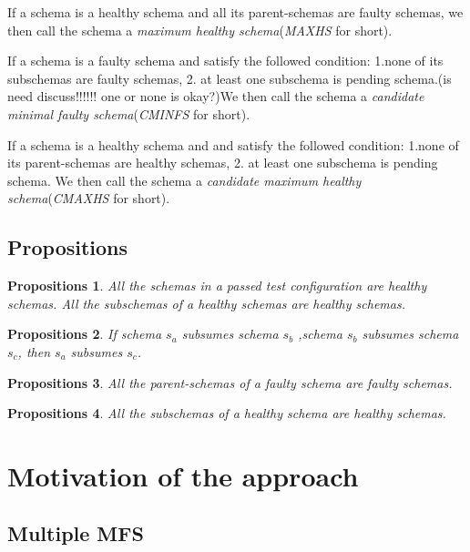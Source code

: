 \documentclass[10pt,journal,cspaper,compsoc]{IEEEtran}
\begin{document}
\begin{definition}
If a schema is a healthy schema and all its parent-schemas are faulty schemas, we then call the schema a \emph{maximum healthy schema}(\emph{MAXHS} for short).
\end{definition}
\begin{definition}
If a schema is a faulty schema and satisfy the followed condition:
1.none of its subschemas are faulty schemas, 2. at least one subschema is pending schema.(is need discuss!!!!!! one or none is okay?)We then call the schema a \emph{candidate minimal faulty schema}(\emph{CMINFS} for short).
\end{definition}
\begin{definition}
If a schema is a healthy schema and and satisfy the followed condition:
1.none of its  parent-schemas are healthy schemas, 2. at least one subschema is pending schema. We then call the schema a \emph{candidate maximum healthy schema}(\emph{CMAXHS} for short).
\end{definition}

\subsection{Propositions}\label{sec:back:propositinon}
\newtheorem{proposition}{Propositions}
\begin{proposition}
All the schemas in a passed test configuration are healthy schemas.
All the subschemas of a healthy schemas are healthy schemas.
\end{proposition}
\begin{proposition}
If schema $s_{a}$ subsumes  schema $s_{b}$ ,schema  $s_{b}$ subsumes schema $s_{c}$, then $s_{a}$  subsumes $s_{c}$.
\end{proposition}
\begin{proposition}
All the parent-schemas of a faulty schema are faulty schemas.
\end{proposition}
\begin{proposition}
All the subschemas of a healthy schema are healthy schemas.
\end{proposition}


\section{Motivation of the approach}\label{sec:motiv}

\subsection{Multiple MFS}
\end{document}
